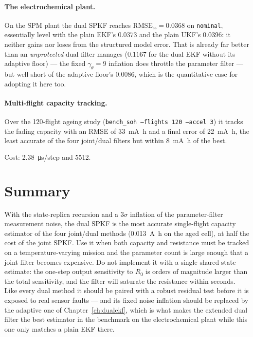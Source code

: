 \paragraph{The electrochemical plant.}  On the SPM plant the dual SPKF reaches
$\text{RMSE}_\text{ss}=0.0368$ on \texttt{nominal}, essentially level with the plain EKF's $0.0373$
and the plain UKF's $0.0396$: it neither gains nor loses from the structured model error.  That is
already far better than an \emph{unprotected} dual filter manages ($0.1167$ for the dual EKF without
its adaptive floor) --- the fixed $\gamma_\theta=9$ inflation does throttle the parameter filter ---
but well short of the adaptive floor's $0.0086$, which is the quantitative case for adopting it here
too.

\paragraph{Multi-flight capacity tracking.}  Over the 120-flight ageing study
(\texttt{bench\_soh --flights 120 --accel 3}) it tracks the fading capacity with an RMSE of
\SI{33}{\milli\ampere\hour} and a final error of \SI{+22}{\milli\ampere\hour}, the least accurate of
the four joint/dual filters but within \SI{8}{\milli\ampere\hour} of the best.

Cost: \SI{2.38}{\micro\second}/step and \SI{5512}{\byte}.

\section{Summary}
With the state-replica recursion and a $3\sigma$ inflation of the parameter-filter measurement
noise, the dual SPKF is the most accurate single-flight capacity estimator of the four joint/dual
methods (\SI{0.013}{\ampere\hour} on the aged cell), at half the cost of the joint SPKF.  Use it when both capacity and resistance must be
tracked on a temperature-varying mission and the parameter count is large enough that a joint filter
becomes expensive.  Do not implement it with a single shared state estimate: the one-step output
sensitivity to $R_0$ is orders of magnitude larger than the total sensitivity, and the filter will
saturate the resistance within seconds.  Like every dual method it should be paired with a robust
residual test before it is exposed to real sensor faults --- and its fixed noise inflation should be
replaced by the adaptive one of Chapter~\ref{ch:dualekf}, which is what makes the extended dual
filter the best estimator in the benchmark on the electrochemical plant while this one only matches
a plain EKF there.
